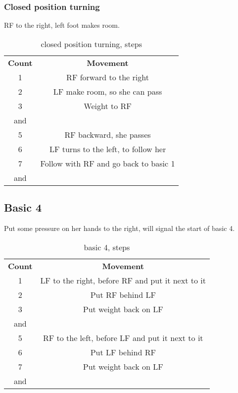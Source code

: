 \subsubsection{Closed position turning}
RF to the right, left foot makes room.
\begin{table}[H]
\centering
\begin{tabular}{cc}
  \toprule
  \textbf{Count} & \textbf{Movement}\\
  \cmidrule(lr){1-1}\cmidrule(lr){2-2}
  1 & RF forward to the right\\
  2 & LF make room, so she can pass\\
  3 & Weight to RF\\
  and & \\
  5 & RF backward, she passes\\
  6 & LF turns to the left, to follow her\\
  7 & Follow with RF and go back to basic 1\\
  and & \\
  \bottomrule
\end{tabular}
\label{closed_position_turning}
\caption{closed position turning, steps}
\end{table}

\subsection{Basic 4}
Put some pressure on her hands to the right, will signal the start of basic 4.\\
\begin{table}[H]
\centering
\begin{tabular}{cc}
  \toprule
  \textbf{Count} & \textbf{Movement}\\
  \cmidrule(lr){1-1}\cmidrule(lr){2-2}
  1 & LF to the right, before RF and put it next to it\\
  2 & Put RF behind LF\\
  3 & Put weight back on LF\\
  and & \\
  5 & RF to the left, before LF and put it next to it\\
  6 & Put LF behind RF\\
  7 & Put weight back on LF\\
  and & \\
  \bottomrule
\end{tabular}
\label{basic4_steps}
\caption{basic 4, steps}
\end{table}

